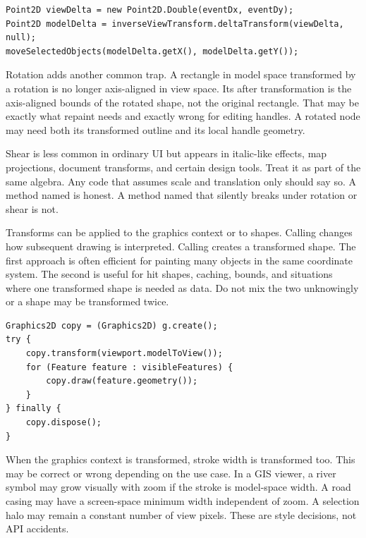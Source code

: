 \begin{lstlisting}[caption={Converting a drag delta without applying translation.}]
Point2D viewDelta = new Point2D.Double(eventDx, eventDy);
Point2D modelDelta = inverseViewTransform.deltaTransform(viewDelta, null);
moveSelectedObjects(modelDelta.getX(), modelDelta.getY());
\end{lstlisting}

Rotation adds another common trap. A rectangle in model space transformed by a rotation is no longer axis-aligned in view space. Its  after transformation is the axis-aligned bounds of the rotated shape, not the original rectangle. That may be exactly what repaint needs and exactly wrong for editing handles. A rotated node may need both its transformed outline and its local handle geometry.

Shear is less common in ordinary UI but appears in italic-like effects, map projections, document transforms, and certain design tools. Treat it as part of the same algebra. Any code that assumes scale and translation only should say so. A method named  is honest. A method named  that silently breaks under rotation or shear is not.

Transforms can be applied to the graphics context or to shapes. Calling  changes how subsequent drawing is interpreted. Calling  creates a transformed shape. The first approach is often efficient for painting many objects in the same coordinate system. The second is useful for hit shapes, caching, bounds, and situations where one transformed shape is needed as data. Do not mix the two unknowingly or a shape may be transformed twice.

\begin{lstlisting}[caption={Painting many model shapes through one graphics transform.}]
Graphics2D copy = (Graphics2D) g.create();
try {
    copy.transform(viewport.modelToView());
    for (Feature feature : visibleFeatures) {
        copy.draw(feature.geometry());
    }
} finally {
    copy.dispose();
}
\end{lstlisting}

When the graphics context is transformed, stroke width is transformed too. This may be correct or wrong depending on the use case. In a GIS viewer, a river symbol may grow visually with zoom if the stroke is model-space width. A road casing may have a screen-space minimum width independent of zoom. A selection halo may remain a constant number of view pixels. These are style decisions, not API accidents.

